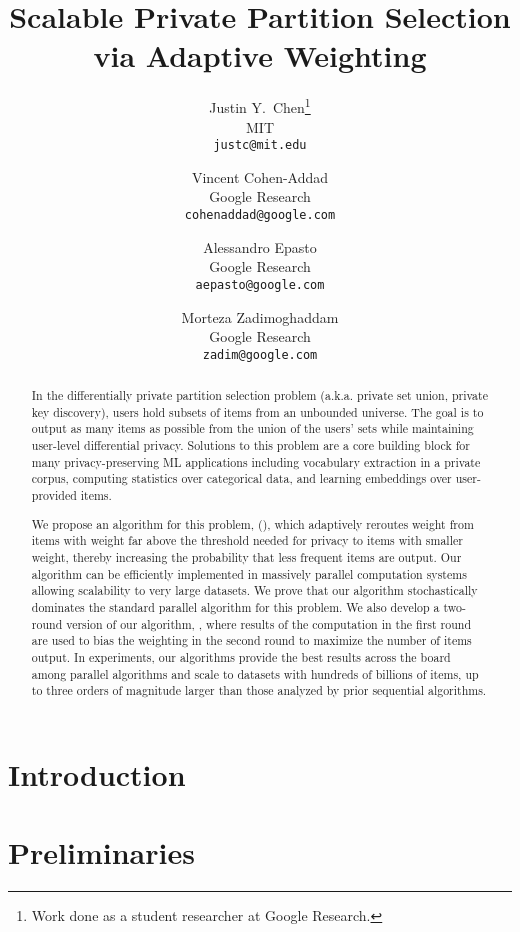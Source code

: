 \documentclass[11pt]{article}
\title{Scalable Private Partition Selection via Adaptive Weighting}
\author{%
  Justin Y.\ Chen\thanks{Work done as a student researcher at Google Research.} \\
  MIT \\
  \texttt{justc@mit.edu} \\
  \and
  Vincent Cohen-Addad \\
  Google Research\\
  \texttt{cohenaddad@google.com} \\
  \and
  Alessandro Epasto\\
  Google Research \\
  \texttt{aepasto@google.com} \\
  \and
  Morteza Zadimoghaddam \\
  Google Research \\
  \texttt{zadim@google.com} \\
}
\begin{document}
\maketitle

\begin{abstract}
In the differentially private partition selection problem (a.k.a. private set union, private key discovery), users hold subsets of items from an unbounded universe. The goal is to output as many items as possible from the union of the users' sets while maintaining user-level differential privacy. Solutions to this problem are a core building block for many privacy-preserving ML applications including vocabulary extraction in a private corpus, computing statistics over categorical data, and learning embeddings over user-provided items.  

We propose an algorithm for this problem, \ouralgolong{} (\ouralgo{}), which adaptively reroutes weight from items with weight far above the threshold needed for privacy to items with smaller weight, thereby increasing the probability that less frequent items are output.  Our algorithm can be efficiently implemented in massively parallel computation systems allowing scalability to very large datasets. We prove that our algorithm stochastically dominates the standard parallel algorithm for this problem. We also develop a two-round version of our algorithm, \ouralgotworounds{}, where results of the computation in the first round are used to bias the weighting in the second round to maximize the number of items output. In experiments, our algorithms provide the best results across the board among parallel algorithms and scale to datasets with hundreds of billions of items, up to three orders of magnitude larger than those analyzed by prior sequential algorithms.
\end{abstract}

\setcounter{page}{0}
\thispagestyle{empty}

\newpage
\tableofcontents
\setcounter{page}{0}
\thispagestyle{empty}

\newpage


\section{Introduction}\label{sec:intro}


\section{Preliminaries}\label{sec:prelim}

\end{document}
